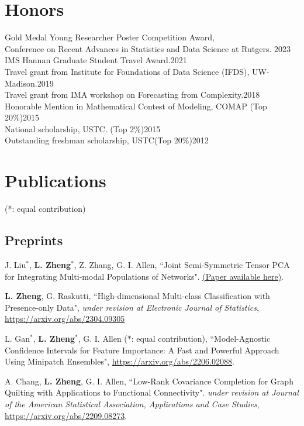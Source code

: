\documentclass[letterpaper,11pt]{article}
\begin{document}
		\section{Honors}
	{ Gold Medal Young Researcher Poster Competition Award, \\Conference on Recent Advances in Statistics and Data Science at Rutgers. \hfill 2023\\
		
		IMS Hannan Graduate Student Travel Award.\hfill 2021\\
		Travel grant from Institute for Foundations of Data Science (IFDS), UW-Madison.\hfill                       2019\\
		Travel grant from IMA workshop on Forecasting from Complexity.\hfill                              2018\\
		Honorable Mention in Mathematical Contest of Modeling, COMAP (Top 20\%)\hfill        2015\\
		National scholarship, USTC. (Top 2\%)\hfill                                       2015\\
		Outstanding freshman scholarship, USTC(Top 20\%)\hfill                                   2012\\}
	
	\section{Publications}
	(*: equal contribution)
	\subsection*{Preprints}
	\begin{etaremune}[start=14]
		\item J. Liu$^{*}$, {\bf L. Zheng}$^{*}$, Z. Zhang, G. I. Allen, ``Joint Semi-Symmetric Tensor PCA for Integrating Multi-modal Populations of Networks".  \href{https://lili-zheng-stat.github.io/JisstPCA.pdf}{(Paper available here)}.
		\item {\bf L. Zheng}, G. Raskutti, ``High-dimensional Multi-class Classification with Presence-only Data", {\em under revision at Electronic Journal of Statistics},  \href{https://arxiv.org/abs/2304.09305}{https://arxiv.org/abs/2304.09305}
		\item L. Gan$^{*}$, {\bf L. Zheng}$^{*}$, G. I. Allen ($*$: equal contribution), ``Model-Agnostic Confidence Intervals for Feature Importance: A Fast and Powerful Approach Using Minipatch Ensembles", \href{https://arxiv.org/abs/2206.02088}{https://arxiv.org/abs/2206.02088}.
		\item A. Chang, {\bf L. Zheng}, G. I. Allen, ``Low-Rank Covariance Completion for Graph Quilting with Applications to Functional Connectivity". {\em under revision at Journal of the American Statistical Association, Applications and Case Studies}, \href{https://arxiv.org/abs/2209.08273}{https://arxiv.org/abs/2209.08273}.
	\end{etaremune}
\end{document}

